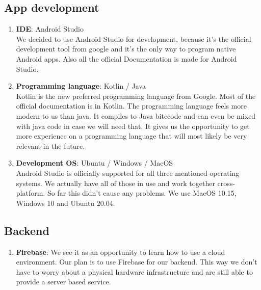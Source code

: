 \documentclass[conference]{IEEEtran}
\numberwithin{figure}{subsection}
\begin{document}
\subsection{App development}
\begin{enumerate}
 \item \textbf{IDE}: Android Studio\\
    We decided to use Android Studio for development, because it's the official development tool from google and it's the only way to program native Android apps. Also all the official Documentation is made for Android Studio.\\
 
 \item \textbf{Programming language}: Kotlin / Java\\
    Kotlin is the new preferred programming language from Google. Most of the official documentation is in Kotlin. The programming language feels more modern to us than java. It compiles to Java bitecode and can even be mixed with java code in case we will need that. It gives us the opportunity to get more experience on a programming language that will most likely be very relevant in the future.\\
 
 \item \textbf{Development OS}: Ubuntu / Windows / MacOS\\
    Android Studio is officially supported for all three mentioned operating systems. We actually have all of those in use and work together cross-platform. So far this didn't cause any problems. We use MacOS 10.15, Windows 10 and Ubuntu 20.04.\\
 \end{enumerate}

\subsection{Backend}
\begin{enumerate}
 \item \textbf{Firebase}: 
 \newline We see it as an opportunity to learn how to use a cloud environment. Our plan is to use Firebase for our backend. This way we don't have to worry about a physical hardware infrastructure and are still able to provide a server based service.\\
 
\end{enumerate}
\end{document}
